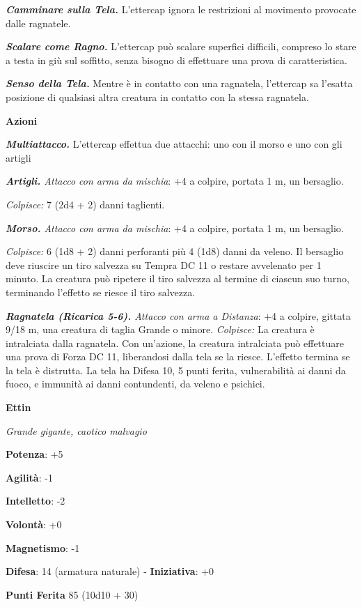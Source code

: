 \begin{multicols}{2}
\emph{\textbf{Camminare sulla Tela.}} L'ettercap ignora le restrizioni
al movimento provocate dalle ragnatele.

\emph{\textbf{Scalare come Ragno.}} L'ettercap può scalare superfici
difficili, compreso lo stare a testa in giù sul soffitto, senza bisogno
di effettuare una prova di caratteristica.

\emph{\textbf{Senso della Tela.}} Mentre è in contatto con una
ragnatela, l'ettercap sa l'esatta posizione di qualsiasi altra creatura
in contatto con la stessa ragnatela.

\smallskip\textbf{Azioni}

\emph{\textbf{Multiattacco.}} L'ettercap effettua due attacchi: uno con
il morso e uno con gli artigli

\emph{\textbf{Artigli.} Attacco con arma da mischia}: +4 a colpire,
portata 1 m, un bersaglio.

\emph{Colpisce:} 7 (2d4 + 2) danni taglienti.

\emph{\textbf{Morso.} Attacco con arma da mischia}: +4 a colpire,
portata 1 m, un bersaglio.

\emph{Colpisce:} 6 (1d8 + 2) danni perforanti più 4 (1d8) danni da
veleno. Il bersaglio deve riuscire un tiro salvezza su Tempra DC
11 o restare avvelenato per 1 minuto. La creatura può ripetere il tiro
salvezza al termine di ciascun suo turno, terminando l'effetto se riesce
il tiro salvezza.

\emph{\textbf{Ragnatela (Ricarica 5-6).} Attacco con arma a Distanza}:
+4 a colpire, gittata 9/18 m, una creatura di taglia Grande o minore.
\emph{Colpisce:} La creatura è intralciata dalla ragnatela. Con
un'azione, la creatura intralciata può effettuare una prova di Forza DC
11, liberandosi dalla tela se la riesce. L'effetto termina se la tela è
distrutta. La tela ha Difesa 10, 5 punti ferita, vulnerabilità ai danni da
fuoco, e immunità ai danni contundenti, da veleno e psichici.

\textbf{Ettin}

\emph{Grande gigante, caotico malvagio}

\textbf{Potenza}: +5

\textbf{Agilità}: -1

\textbf{Intelletto}: -2

\textbf{Volontà}: +0

\textbf{Magnetismo}: -1

\textbf{Difesa}: 14 (armatura naturale) - \textbf{Iniziativa}: +0

\textbf{Punti Ferita} 85 (10d10 + 30)


\end{multicols}
